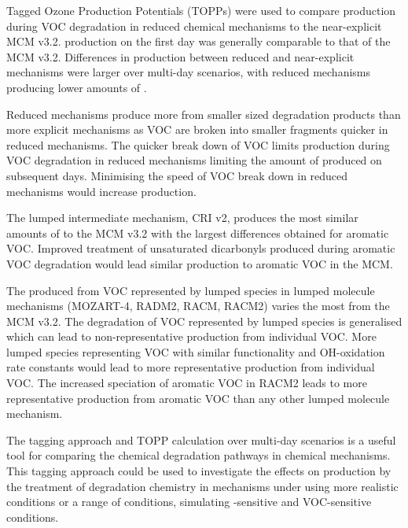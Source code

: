 Tagged Ozone Production Potentials (TOPPs) were used to compare  production during VOC degradation in reduced chemical mechanisms to the near-explicit MCM v3.2. 
 production on the first day was generally comparable to that of the MCM v3.2.
Differences in  production between reduced and near-explicit mechanisms were larger over multi-day scenarios, with reduced mechanisms producing lower amounts of .

Reduced mechanisms produce more  from smaller sized degradation products than more explicit mechanisms as VOC are broken into smaller fragments quicker in reduced mechanisms.
The quicker break down of VOC limits  production during VOC degradation in reduced mechanisms limiting the amount of  produced on subsequent days.
Minimising the speed of VOC break down in reduced mechanisms would increase  production.

The lumped intermediate mechanism, CRI v2, produces the most similar amounts of  to the MCM v3.2 with the largest differences obtained for aromatic VOC.
Improved treatment of unsaturated dicarbonyls produced during aromatic VOC degradation would lead similar  production to aromatic VOC in the MCM.

The  produced from VOC represented by lumped species in lumped molecule mechanisms (MOZART-4, RADM2, RACM, RACM2) varies the most from the MCM v3.2.
The degradation of VOC represented by lumped species is generalised which can lead to non-representative  production from individual VOC.
More lumped species representing VOC with similar functionality and OH-oxidation rate constants would lead to more representative  production from individual VOC.
The increased speciation of aromatic VOC in RACM2 leads to more representative  production from aromatic VOC than any other lumped molecule mechanism.

The tagging approach and TOPP calculation over multi-day scenarios is a useful tool for comparing the chemical degradation pathways in chemical mechanisms. 
This tagging approach could be used to investigate the effects on  production by the treatment of degradation chemistry in mechanisms under using more realistic  conditions or a range of  conditions, simulating -sensitive and VOC-sensitive conditions.
